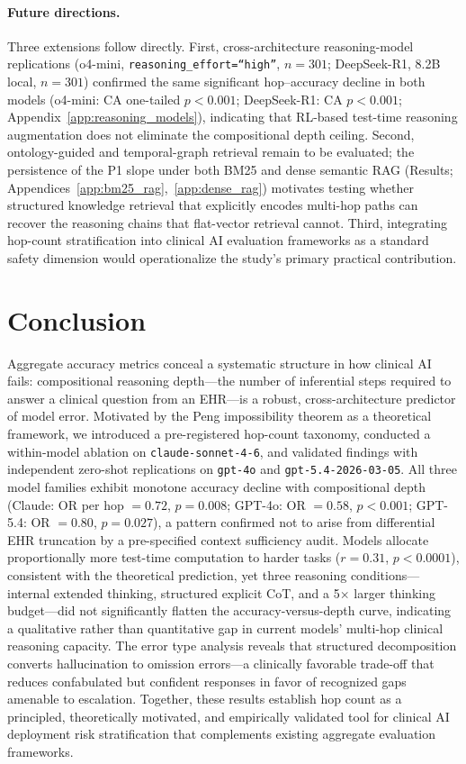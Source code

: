 \documentclass{article}
\begin{document}
\paragraph{Future directions.}
Three extensions follow directly. First, cross-architecture reasoning-model replications (o4-mini, \texttt{reasoning\_effort=``high''}, $n=301$; DeepSeek-R1, 8.2B local, $n=301$) confirmed the same significant hop--accuracy decline in both models (o4-mini: CA one-tailed $p < 0.001$; DeepSeek-R1: CA $p < 0.001$; Appendix~\ref{app:reasoning_models}), indicating that RL-based test-time reasoning augmentation does not eliminate the compositional depth ceiling. Second, ontology-guided and temporal-graph retrieval remain to be evaluated; the persistence of the P1 slope under both BM25 and dense semantic RAG (Results; Appendices~\ref{app:bm25_rag},~\ref{app:dense_rag}) motivates testing whether structured knowledge retrieval that explicitly encodes multi-hop paths can recover the reasoning chains that flat-vector retrieval cannot. Third, integrating hop-count stratification into clinical AI evaluation frameworks as a standard safety dimension would operationalize the study's primary practical contribution.

\section{Conclusion}

Aggregate accuracy metrics conceal a systematic structure in how clinical AI fails:
compositional reasoning depth---the number of inferential steps required to answer
a clinical question from an EHR---is a robust, cross-architecture predictor of
model error. Motivated by the Peng impossibility theorem as a theoretical framework,
we introduced a pre-registered hop-count taxonomy, conducted a within-model ablation
on \texttt{claude-sonnet-4-6}, and validated findings with independent zero-shot
replications on \texttt{gpt-4o} and \texttt{gpt-5.4-2026-03-05}. All three model families exhibit monotone accuracy decline with
compositional depth (Claude: OR per hop $= 0.72$, $p = 0.008$; GPT-4o: OR $= 0.58$,
$p < 0.001$; GPT-5.4: OR $= 0.80$, $p = 0.027$), a pattern confirmed not to arise from differential EHR truncation
by a pre-specified context sufficiency audit. Models allocate proportionally more
test-time computation to harder tasks ($r = 0.31$, $p < 0.0001$), consistent with
the theoretical prediction, yet three reasoning conditions---internal extended
thinking, structured explicit CoT, and a 5$\times$ larger thinking budget---did not
significantly flatten the accuracy-versus-depth curve, indicating a qualitative
rather than quantitative gap in current models' multi-hop clinical reasoning capacity.
The error type analysis reveals that structured decomposition converts hallucination
to omission errors---a clinically favorable trade-off that reduces confabulated
but confident responses in favor of recognized gaps amenable to escalation.
Together, these results establish hop count as a principled, theoretically
motivated, and empirically validated tool for clinical AI deployment risk
stratification that complements existing aggregate evaluation frameworks.
\end{document}
